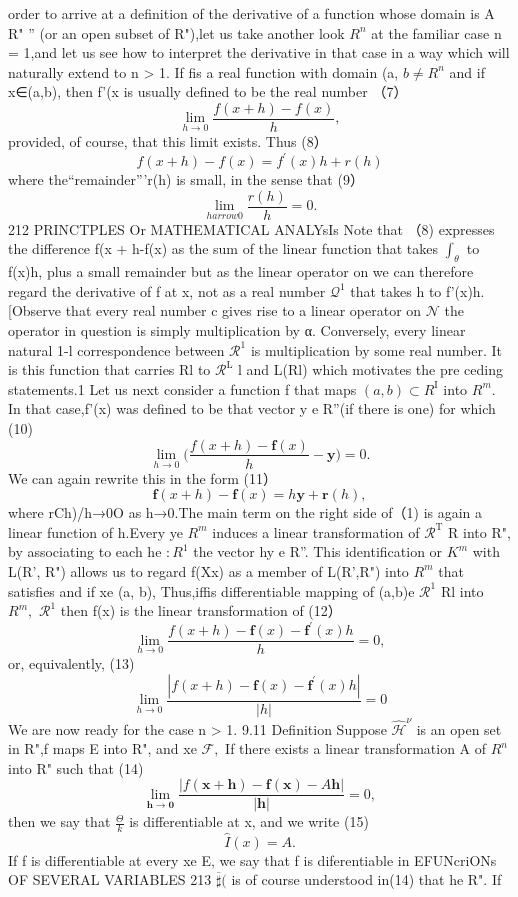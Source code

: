 order to arrive at a definition of the derivative of a function whose domain is A R" ” (or an open subset of R"),let us take another look $R^{n}$ at the familiar case n = 1,and let us see how to interpret the derivative in that case in a way which will naturally extend to n > 1. If fis a real function with domain (a, $\scriptstyle b\neq R^{n}$ and if x∈(a,b), then f'(x is usually defined to be the real number （7） $$ \operatorname*{lim}_{h\to0}{\frac{f(x+h)-f(x)}{h}}, $$ provided, of course, that this limit exists. Thus (8） $$ f(x+h)-f(x)=f^{\prime}(x)h+r(h) $$ where the“remainder”’r(h) is small, in the sense that (9） $$ \operatorname*{lim}_{h arrow0}{\frac{r(h)}{h}}=0. $$212 PRINCTPLES Or MATHEMATICAL ANALYsIs Note that （8) expresses the difference f(x + h-f(x) as the sum of the linear function that takes $\textstyle{\int}_{\theta}$ to f(x)h, plus a small remainder but as the linear operator on we can therefore regard the derivative of f at x, not as a real number $\textstyle{\mathcal{Q}}^{1}$ that takes h to f'(x)h. [Observe that every real number c gives rise to a linear operator on $\textstyle{\mathcal{N}}$ the operator in question is simply multiplication by α. Conversely, every linear natural 1-l correspondence between $\textstyle{\mathcal{R}}^{1}$ is multiplication by some real number. It is this function that carries Rl to $\textstyle{\mathcal{R}}^{\mathrm{L}}$ l and L(Rl) which motivates the pre ceding statements.1 Let us next consider a function f that maps $(a,b)\subset R^{\operatorname{I}}$ into $R^{m}.$ In that case,f'(x) was defined to be that vector y e R”(if there is one) for which (10) $$ \operatorname*{lim}_{h\to0}{\Big(}{\frac{f(x+h)-\mathbf{f}(x)}{h}}-\mathbf{y}{\Big)}=0. $$ We can again rewrite this in the form (11） $$ \mathbf{f}(x+h)-\mathbf{f}(x)=h\mathbf{y}+\mathbf{r}(h), $$ where rCh)/h→0O as h→0.The main term on the right side of（1) is again a linear function of h.Every ye $R^{m}$ induces a linear transformation of $\textstyle{\mathcal{R}}^{\mathrm{T}}$ R into R", by associating to each he $:R^{1}$ the vector hy e R”. This identification or $\textstyle K^{m}$ with L(R', R") allows us to regard f(Xx) as a member of L(R',R") into $R^{m}$ that satisfies and if xe (a, b), Thus,iffis differentiable mapping of (a,b)e $\textstyle{\mathcal{R}}^{1}$ Rl into $R^{m},$ $\textstyle{\mathcal{R}}^{1}$ then f(x) is the linear transformation of (12） $$ \operatorname*{lim}_{h\to0}{\frac{f(x+h)-\mathbf{f}(x)-\mathbf{f}^{\prime}(x)h}{h}}=0, $$ or, equivalently, (13) $$ \operatorname*{lim}_{h\to0}{\frac{|f(x+h)-\mathbf{f}(x)-\mathbf{f}^{\prime}(x)h|}{|h|}}=0 $$ We are now ready for the case n > 1. 9.11 Definition Suppose ${\widehat{\mathcal{H}}}^{\nu}$ is an open set in R",f maps E into R", and xe ${\mathcal{F}},$ If there exists a linear transformation A of $\textstyle R^{n}$ into R" such that (14) $$ \operatorname*{lim}_{\mathbf{h\to0}}{\frac{|f(\mathbf{x}+\mathbf{h})-\mathbf{f}(\mathbf{x})-A\mathbf{h}|}{|\mathbf{h}|}}=0, $$ then we say that $\frac{\Theta}{k}$ is differentiable at x, and we write (15) $$ \hat{I}\left(x\right)=A. $$ If f is differentiable at every xe E, we say that f is diferentiable in EFUNcriONs OF SEVERAL VARIABLES 213 $\overline{{\sharp}}($ is of course understood in(14) that he R". If 